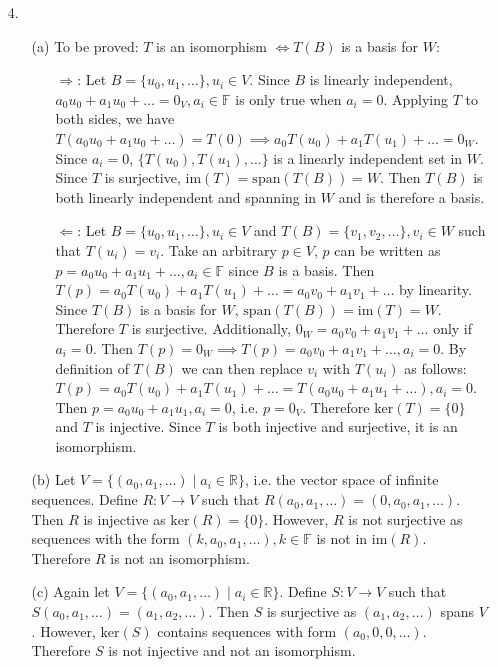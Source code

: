 \documentclass{article}
\begin{document}
\begin{itemize}
	\item [4.]
	      \begin{itemize}
			  \item [(a)] To be proved: $T$ is an isomorphism $\Leftrightarrow T(B)$ is a basis for $W$:
			  \begin{itemize}
				  \item [$\Rightarrow$:] Let $B=\{u_0,u_1,\ldots\}, u_i\in V$. Since $B$ is linearly independent, $a_0u_0+a_1u_0+\ldots=0_V, a_i\in\mathbb{F}$ is only true when $a_i=0$. Applying $T$ to both sides, we have $T(a_0u_0+a_1u_0+\ldots)=T(0) \implies a_0T(u_0)+a_1T(u_1)+\ldots=0_W$. Since $a_i=0$, $\{T(u_0),T(u_1),\ldots\}$ is a linearly independent set in $W$. Since $T$ is surjective, $\text{im}(T)=\text{span}(T(B))=W$. Then $T(B)$ is both linearly independent and spanning in $W$ and is therefore a basis.
				  \item [$\Leftarrow$:] Let $B=\{u_0,u_1,\ldots\}, u_i\in V$ and $T(B)=\{v_1,v_2,\ldots\},v_i\in W$ such that $T(u_i)=v_i$. Take an arbitrary $p\in V$, $p$ can be written as $p=a_0u_0+a_1u_1+\ldots, a_i\in\mathbb{F}$ since $B$ is a basis. Then $T(p)=a_0T(u_0)+a_1T(u_1)+\ldots=a_0v_0+a_1v_1+\ldots$ by linearity. Since $T(B)$ is a basis for $W$, $\text{span}(T(B))=\text{im}(T)=W$. Therefore $T$ is surjective. Additionally, $0_W=a_0v_0+a_1v_1+\ldots$ only if $a_i=0$. Then $T(p)=0_W\implies T(p)=a_0v_0+a_1v_1+\ldots, a_i=0$. By definition of $T(B)$ we can then replace $v_i$ with $T(u_i)$ as follows: $T(p)=a_0T(u_0)+a_1T(u_1)+\ldots=T(a_0u_0+a_1u_1+\ldots), a_i=0$. Then $p=a_0u_0+a_1u_1,a_i=0$, i.e. $p=0_V$. Therefore $\text{ker}(T)=\{0\}$ and $T$ is injective. Since $T$ is both injective and surjective, it is an isomorphism.
			  \end{itemize}
		      \item [(b)] Let $V=\{(a_0,a_1,\ldots)\mid a_i\in\mathbb{R}\}$, i.e. the vector space of infinite sequences. Define $R:V\rightarrow V$ such that $R(a_0,a_1,\ldots)=(0,a_0,a_1,\ldots)$. Then $R$ is injective as $\text{ker}(R)=\{0\}$. However, $R$ is not surjective as sequences with the form $(k,a_0,a_1,\ldots),k\in\mathbb{F}$ is not in $\text{im}(R)$. Therefore $R$ is not an isomorphism. 
		      \item [(c)] Again let $V=\{(a_0,a_1,\ldots)\mid a_i\in\mathbb{R}\}$. Define $S:V\rightarrow V$ such that $S(a_0,a_1,\ldots)=(a_1,a_2,\ldots)$. Then $S$ is surjective as $(a_1,a_2,\ldots)$ spans $V$. However, $\text{ker}(S)$ contains sequences with form $(a_0,0,0,\ldots)$. Therefore $S$ is not injective and not an isomorphism.
	      \end{itemize}
\end{itemize}
\end{document}
